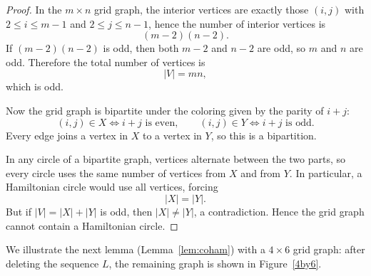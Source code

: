 \documentclass[12pt]{amsart}
\theoremstyle{theorem}%
\theoremstyle{definition}%
\begin{document}
\begin{proof}
In the $m\times n$ grid graph, the interior vertices are exactly those $(i,j)$ with
$2\le i \le m-1$ and $2\le j \le n-1$, hence the number of interior vertices is
\[
(m-2)(n-2).
\]
If $(m-2)(n-2)$ is odd, then both $m-2$ and $n-2$ are odd, so $m$ and $n$ are odd. Therefore the total number of vertices is
\[
|V|=mn,
\]
which is odd.

Now the grid graph is bipartite under the coloring given by the parity of $i+j$:
\[
(i,j)\in X \iff i+j \text{ is even}, 
\qquad
(i,j)\in Y \iff i+j \text{ is odd}.
\]
Every edge joins a vertex in $X$ to a vertex in $Y$, so this is a bipartition.

In any circle of a bipartite graph, vertices alternate between the two parts, so every circle uses the same number of vertices from $X$ and from $Y$. In particular, a Hamiltonian circle would use all vertices, forcing
\[
|X|=|Y|.
\]
But if $|V|=|X|+|Y|$ is odd, then $|X|\neq |Y|$, a contradiction. Hence the grid graph cannot contain a Hamiltonian circle.
\end{proof}







We illustrate the next lemma (Lemma~\ref{lem:coham}) with a $4\times6$ grid graph: after deleting the sequence $L$, the remaining graph is shown in Figure~\ref{4by6}.
\end{document}
